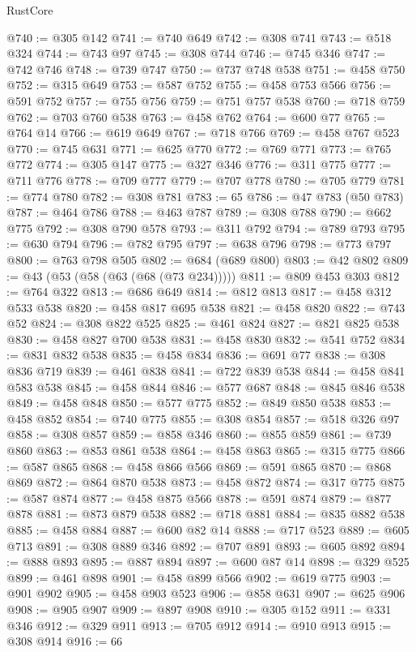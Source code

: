 \begin{lexlean}{RustCore}
\begin{coremodule}
@740 := @305 @142
@741 := @740 @649
@742 := @308 @741
@743 := @518 @324
@744 := @743 @97
@745 := @308 @744
@746 := @745 @346
@747 := @742 @746
@748 := @739 @747
@750 := @737 @748 @538
@751 := @458 @750
@752 := @315 @649
@753 := @587 @752
@755 := @458 @753 @566
@756 := @591 @752
@757 := @755 @756
@759 := @751 @757 @538
@760 := @718 @759
@762 := @703 @760 @538
@763 := @458 @762
@764 := @600 @77
@765 := @764 @14
@766 := @619 @649
@767 := @718 @766
@769 := @458 @767 @523
@770 := @745 @631
@771 := @625 @770
@772 := @769 @771
@773 := @765 @772
@774 := @305 @147
@775 := @327 @346
@776 := @311 @775
@777 := @711 @776
@778 := @709 @777
@779 := @707 @778
@780 := @705 @779
@781 := @774 @780
@782 := @308 @781
@783 := 65
@786 := @47 @783 (@50 @783)
@787 := @464 @786
@788 := @463 @787
@789 := @308 @788
@790 := @662 @775
@792 := @308 @790 @578
@793 := @311 @792
@794 := @789 @793
@795 := @630 @794
@796 := @782 @795
@797 := @638 @796
@798 := @773 @797
@800 := @763 @798 @505
@802 := @684 (@689 @800)
@803 := @42 @802
@809 := @43 (@53 (@58 (@63 (@68 (@73 @234)))))
@811 := @809 @453 @303
@812 := @764 @322
@813 := @686 @649
@814 := @812 @813
@817 := @458 @312 @533 @538
@820 := @458 @817 @695 @538
@821 := @458 @820
@822 := @743 @52
@824 := @308 @822 @525
@825 := @461 @824
@827 := @821 @825 @538
@830 := @458 @827 @700 @538
@831 := @458 @830
@832 := @541 @752
@834 := @831 @832 @538
@835 := @458 @834
@836 := @691 @77
@838 := @308 @836 @719
@839 := @461 @838
@841 := @722 @839 @538
@844 := @458 @841 @583 @538
@845 := @458 @844
@846 := @577 @687
@848 := @845 @846 @538
@849 := @458 @848
@850 := @577 @775
@852 := @849 @850 @538
@853 := @458 @852
@854 := @740 @775
@855 := @308 @854
@857 := @518 @326 @97
@858 := @308 @857
@859 := @858 @346
@860 := @855 @859
@861 := @739 @860
@863 := @853 @861 @538
@864 := @458 @863
@865 := @315 @775
@866 := @587 @865
@868 := @458 @866 @566
@869 := @591 @865
@870 := @868 @869
@872 := @864 @870 @538
@873 := @458 @872
@874 := @317 @775
@875 := @587 @874
@877 := @458 @875 @566
@878 := @591 @874
@879 := @877 @878
@881 := @873 @879 @538
@882 := @718 @881
@884 := @835 @882 @538
@885 := @458 @884
@887 := @600 @82 @14
@888 := @717 @523
@889 := @605 @713
@891 := @308 @889 @346
@892 := @707 @891
@893 := @605 @892
@894 := @888 @893
@895 := @887 @894
@897 := @600 @87 @14
@898 := @329 @525
@899 := @461 @898
@901 := @458 @899 @566
@902 := @619 @775
@903 := @901 @902
@905 := @458 @903 @523
@906 := @858 @631
@907 := @625 @906
@908 := @905 @907
@909 := @897 @908
@910 := @305 @152
@911 := @331 @346
@912 := @329 @911
@913 := @705 @912
@914 := @910 @913
@915 := @308 @914
@916 := 66

\end{coremodule}
\end{lexlean}
